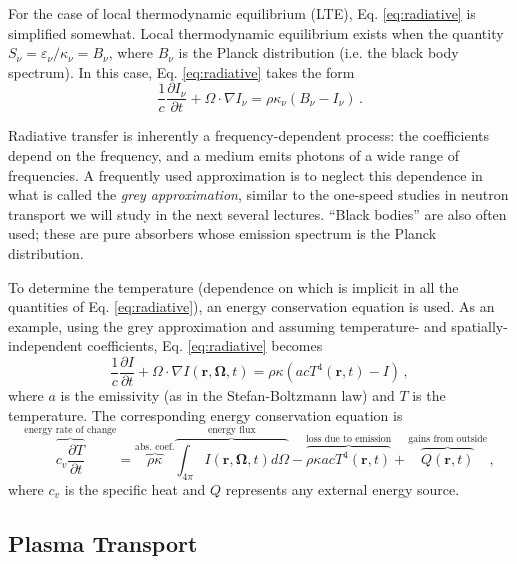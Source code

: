 For the case of local thermodynamic equilibrium (LTE), Eq. \ref{eq:radiative} is simplified somewhat.  Local thermodynamic equilibrium exists when the quantity $S_{\nu} = \varepsilon_{\nu}/\kappa_{\nu} = B_{\nu}$, where $B_{\nu}$ is the Planck distribution (i.e. the black body spectrum).  In this case, Eq. \ref{eq:radiative} takes the form
\begin{equation}
 \frac{1}{c}\frac{\partial I_{\nu}}{\partial t} + \Omega \cdot \nabla I_{\nu} = \rho \kappa_{\nu} (B_{\nu} - I_{\nu}) \, .
 \label{eq:radiativelte}
\end{equation}

Radiative transfer is inherently a frequency-dependent process: the coefficients depend on the frequency, and a medium emits photons of a wide range of frequencies.  A frequently used approximation is to neglect this dependence in what is called the \textit{grey approximation}, similar to the one-speed studies in neutron transport we will study in the next several lectures.  ``Black bodies'' are also often used; these are pure absorbers whose emission spectrum is the Planck distribution.

To determine the temperature (dependence on which is implicit in all the quantities of Eq. \ref{eq:radiative}), an energy conservation equation is used.  As an example, using the grey approximation and assuming temperature- and spatially-independent coefficients, Eq. \ref{eq:radiative} becomes
\begin{equation}
 \frac{1}{c}\frac{\partial I}{\partial t} + \Omega \cdot \nabla I(\mathbf{r},\mathbf{\Omega},t) = \rho \kappa (acT^4(\mathbf{r},t)- I) \, ,
 \label{eq:radiativegrey}
\end{equation}
where $a$ is the emissivity (as in the Stefan-Boltzmann law) and $T$ is the temperature.  The corresponding energy conservation equation is
\begin{equation}
 \overbrace{c_v \frac{\partial T}{\partial t}}^{\text{energy rate of change}} = \overbrace{\rho \kappa}^{\text{abs. coef.}} \overbrace{\int_{4\pi} I(\mathbf{r},\mathbf{\Omega},t) d\Omega}^{\text{energy flux}} - \overbrace{\rho \kappa a c T^4(\mathbf{r},t)}^{\text{loss due to emission}} + \overbrace{Q(\mathbf{r},t)}^{\text{gains from outside}} \, ,
\end{equation}
where $c_v$ is the specific heat and $Q$ represents any external energy source.


\subsection*{Plasma Transport}

